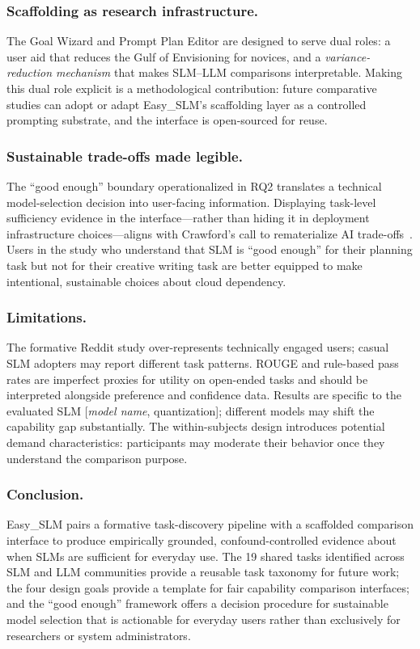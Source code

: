 \subsubsection{Scaffolding as research infrastructure.}
The Goal Wizard and Prompt Plan Editor are designed to serve dual roles: a
user aid that reduces the Gulf of Envisioning for novices, and a
\textit{variance-reduction mechanism} that makes SLM--LLM comparisons
interpretable.
Making this dual role explicit is a methodological contribution: future
comparative studies can adopt or adapt Easy\_SLM's scaffolding layer as
a controlled prompting substrate, and the interface is open-sourced for reuse.

\subsubsection{Sustainable trade-offs made legible.}
The ``good enough'' boundary operationalized in RQ2 translates a technical
model-selection decision into user-facing information.
Displaying task-level sufficiency evidence in the interface---rather than
hiding it in deployment infrastructure choices---aligns with Crawford's call
to rematerialize AI trade-offs~\cite{crawford2024rematerializing}.
Users in the study who understand that SLM is ``good enough'' for their
planning task but not for their creative writing task are better equipped to
make intentional, sustainable choices about cloud dependency.

\subsubsection{Limitations.}
The formative Reddit study over-represents technically engaged users;
casual SLM adopters may report different task patterns.
ROUGE and rule-based pass rates are imperfect proxies for utility on
open-ended tasks and should be interpreted alongside preference and confidence
data.
Results are specific to the evaluated SLM [\textit{model name}, quantization];
different models may shift the capability gap substantially.
The within-subjects design introduces potential demand characteristics:
participants may moderate their behavior once they understand the comparison
purpose.

\subsubsection{Conclusion.}
Easy\_SLM pairs a formative task-discovery pipeline with a scaffolded
comparison interface to produce empirically grounded, confound-controlled
evidence about when SLMs are sufficient for everyday use.
The 19 shared tasks identified across SLM and LLM communities provide a
reusable task taxonomy for future work; the four design goals provide a
template for fair capability comparison interfaces; and the ``good enough''
framework offers a decision procedure for sustainable model selection that
is actionable for everyday users rather than exclusively for researchers
or system administrators.

